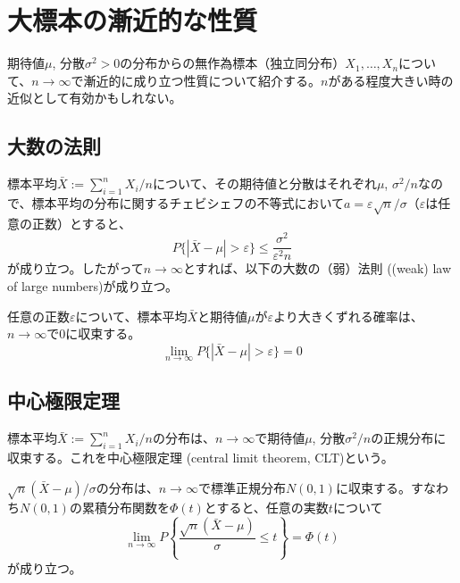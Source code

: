 \documentclass[uplatex,dvipdfmx]{jlreq}
\newcommand\term[1]{\textsf{#1}}
\begin{document}
\section{大標本の漸近的な性質}

期待値$\mu$, 分散$\sigma^2>0$の分布からの無作為標本（独立同分布）$X_1, \dotsc, X_n$について、$n\to\infty$で漸近的に成り立つ性質について紹介する。$n$がある程度大きい時の近似として有効かもしれない。

\subsection{大数の法則}

標本平均$\bar{X} := \sum_{i=1}^n X_i/n$について、その期待値と分散はそれぞれ$\mu$, $\sigma^2/n$なので、標本平均の分布に関するチェビシェフの不等式において$a=\varepsilon\sqrt{n}/\sigma$（$\varepsilon$は任意の正数）とすると、
\begin{equation}
    P\{|\bar{X} - \mu| > \varepsilon\} \leq \frac{\sigma^2}{\varepsilon^2 n}
\end{equation}
が成り立つ。したがって$n\to\infty$とすれば、以下の\term{大数の（弱）法則 ((weak) law of large numbers)}が成り立つ。

\begin{theorem}[大数の（弱）法則]
    任意の正数$\varepsilon$について、標本平均$\bar{X}$と期待値$\mu$が$\varepsilon$より大きくずれる確率は、$n\to\infty$で$0$に収束する。
    \begin{equation}
        \lim_{n\to\infty} P\{|\bar{X} - \mu|>\varepsilon\} = 0
    \end{equation}
\end{theorem}

\subsection{中心極限定理}

標本平均$\bar{X} := \sum_{i=1}^n X_i/n$の分布は、$n\to\infty$で期待値$\mu$, 分散$\sigma^2/n$の正規分布に収束する。これを\term{中心極限定理 (central limit theorem, CLT)}という。

\begin{theorem}[中心極限定理]
    $\sqrt{n}(\bar{X}-\mu)/\sigma$の分布は、$n\to\infty$で標準正規分布$N(0, 1)$に収束する。すなわち$N(0, 1)$の累積分布関数を$\Phi(t)$とすると、任意の実数$t$について
    \begin{equation}
        \lim_{n\to\infty} P\left\{
            \frac{\sqrt{n}(\bar{X}-\mu)}{\sigma} \leq t
        \right\} = \Phi(t)
    \end{equation}
    が成り立つ。
\end{theorem}
\end{document}
